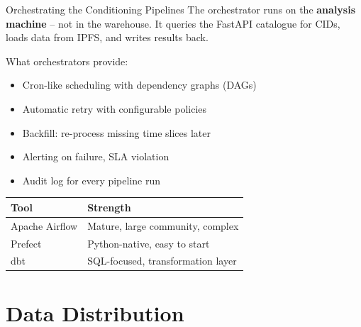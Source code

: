 \documentclass[aspectratio=169]{beamer}
\begin{document}
\begin{frame}{Orchestrating the Conditioning Pipelines}
  The orchestrator runs on the \textbf{analysis machine} –
  not in the warehouse. It queries the FastAPI catalogue for CIDs,
  loads data from IPFS, and writes results back.
  \vspace{0.3em}

  What orchestrators provide:
  \begin{itemize}
    \item Cron-like scheduling with dependency graphs (DAGs)
    \item Automatic retry with configurable policies
    \item Backfill: re-process missing time slices later
    \item Alerting on failure, SLA violation
    \item Audit log for every pipeline run
  \end{itemize}
  \vspace{0.5em}
  \begin{tabular}{ll}
    \toprule
    \textbf{Tool} & \textbf{Strength} \\
    \midrule
    Apache Airflow & Mature, large community, complex \\
    Prefect        & Python-native, easy to start \\
    dbt            & SQL-focused, transformation layer \\
    \bottomrule
  \end{tabular}
\end{frame}

\section{Data Distribution}
\end{document}
